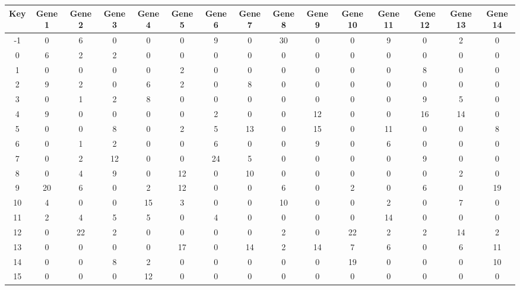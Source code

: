 \begin{tabular}{|c|c|c|c|c|c|c|c|c|c|c|c|c|c|c|}
\hline
Key & Gene 1 & Gene 2 & Gene 3 & Gene 4 & Gene 5 & Gene 6 & Gene 7 & Gene 8 & Gene 9 & Gene 10 & Gene 11 & Gene 12 & Gene 13 & Gene 14 \\
\hline
-1 & 0 & 6 & 0 & 0 & 0 & 9 & 0 & 30 & 0 & 0 & 9 & 0 & 2 & 0 \\
0 & 6 & 2 & 2 & 0 & 0 & 0 & 0 & 0 & 0 & 0 & 0 & 0 & 0 & 0 \\
1 & 0 & 0 & 0 & 0 & 2 & 0 & 0 & 0 & 0 & 0 & 0 & 8 & 0 & 0 \\
2 & 9 & 2 & 0 & 6 & 2 & 0 & 8 & 0 & 0 & 0 & 0 & 0 & 0 & 0 \\
3 & 0 & 1 & 2 & 8 & 0 & 0 & 0 & 0 & 0 & 0 & 0 & 9 & 5 & 0 \\
4 & 9 & 0 & 0 & 0 & 0 & 2 & 0 & 0 & 12 & 0 & 0 & 16 & 14 & 0 \\
5 & 0 & 0 & 8 & 0 & 2 & 5 & 13 & 0 & 15 & 0 & 11 & 0 & 0 & 8 \\
6 & 0 & 1 & 2 & 0 & 0 & 6 & 0 & 0 & 9 & 0 & 6 & 0 & 0 & 0 \\
7 & 0 & 2 & 12 & 0 & 0 & 24 & 5 & 0 & 0 & 0 & 0 & 9 & 0 & 0 \\
8 & 0 & 4 & 9 & 0 & 12 & 0 & 10 & 0 & 0 & 0 & 0 & 0 & 2 & 0 \\
9 & 20 & 6 & 0 & 2 & 12 & 0 & 0 & 6 & 0 & 2 & 0 & 6 & 0 & 19 \\
10 & 4 & 0 & 0 & 15 & 3 & 0 & 0 & 10 & 0 & 0 & 2 & 0 & 7 & 0 \\
11 & 2 & 4 & 5 & 5 & 0 & 4 & 0 & 0 & 0 & 0 & 14 & 0 & 0 & 0 \\
12 & 0 & 22 & 2 & 0 & 0 & 0 & 0 & 2 & 0 & 22 & 2 & 2 & 14 & 2 \\
13 & 0 & 0 & 0 & 0 & 17 & 0 & 14 & 2 & 14 & 7 & 6 & 0 & 6 & 11 \\
14 & 0 & 0 & 8 & 2 & 0 & 0 & 0 & 0 & 0 & 19 & 0 & 0 & 0 & 10 \\
15 & 0 & 0 & 0 & 12 & 0 & 0 & 0 & 0 & 0 & 0 & 0 & 0 & 0 & 0 \\
\hline
\end{tabular}